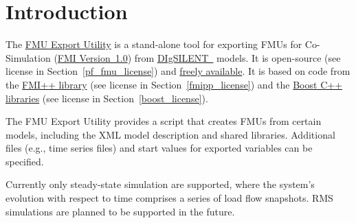 
\chapter{Introduction}


The \href{http://powerfactory-fmu.sourceforge.net}{\fmipp \pf FMU Export Utility} is a stand-alone tool for exporting FMUs for Co-Simulation (\href{https://www.fmi-standard.org/}{FMI Version~1.0}) from \href{http://www.digsilent.com/}{DIgSILENT~\pf} models. It is open-source (see license in Section~\ref{pf_fmu_license}) and \href{http://powerfactory-fmu.sourceforge.net}{freely available}. It is based on code from the \href{http://fmipp.sourceforge.net}{FMI++ library} (see license in Section~\ref{fmipp_license}) and the \href{http://www.boost.org/}{Boost C++ libraries} (see license in Section~\ref{boost_license}).

The \fmipp \pf FMU Export Utility provides a \href{https://www.python.org/}{\python} script that creates FMUs from certain \pf models, including the XML model description and shared libraries. Additional files (e.g., time series files) and start values for exported variables can be specified.

Currently only steady-state simulation are supported, where the system’s evolution with respect to time comprises a series of load flow snapshots.
RMS simulations are planned to be supported in the future.